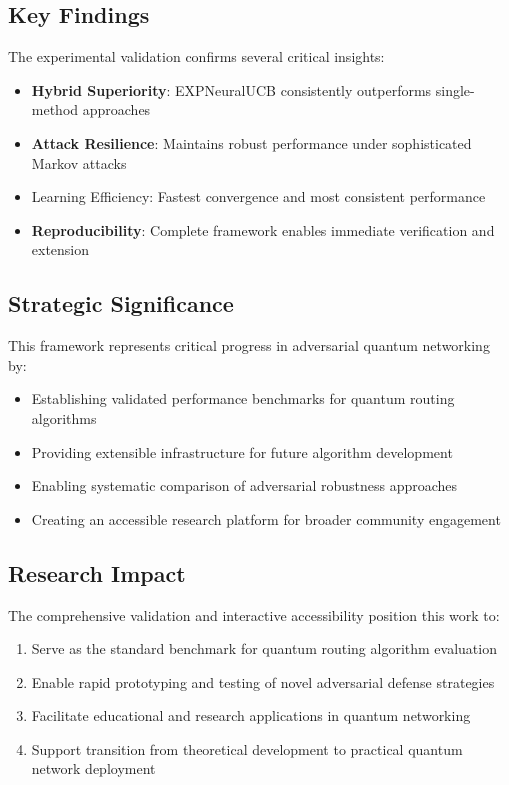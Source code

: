 \documentclass[11pt,a4paper]{article}
\newcommand{\performance}[1]{\textcolor{performancecolor}{\textbf{#1}}}
\newcommand{\highlight}[1]{\colorbox{highlightcolor}{#1}}
\newcommand{\success}[1]{\textcolor{successcolor}{\textbf{#1}}}
\newcommand{\colab}[1]{\textcolor{colabcolor}{\textbf{#1}}}
\begin{document}
\subsection{Key Findings}

The experimental validation confirms several critical insights:

\begin{itemize}
\item \success{Hybrid Superiority}: EXPNeuralUCB consistently outperforms single-method approaches
\item \performance{Attack Resilience}: Maintains robust performance under sophisticated Markov attacks
\item \highlight{Learning Efficiency}: Fastest convergence and most consistent performance
\item \colab{Reproducibility}: Complete framework enables immediate verification and extension
\end{itemize}

\subsection{Strategic Significance}

This framework represents critical progress in adversarial quantum networking by:

\begin{itemize}
\item Establishing validated performance benchmarks for quantum routing algorithms
\item Providing extensible infrastructure for future algorithm development
\item Enabling systematic comparison of adversarial robustness approaches
\item Creating an accessible research platform for broader community engagement
\end{itemize}

\subsection{Research Impact}

The comprehensive validation and interactive accessibility position this work to:
\begin{enumerate}
\item Serve as the standard benchmark for quantum routing algorithm evaluation
\item Enable rapid prototyping and testing of novel adversarial defense strategies
\item Facilitate educational and research applications in quantum networking
\item Support transition from theoretical development to practical quantum network deployment
\end{enumerate}
\end{document}
